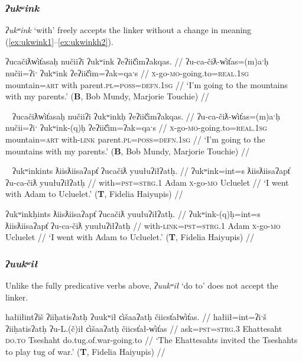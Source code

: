 \subsubsection{\textit{ʔukʷink}} \label{ch:link:ukwink} \textit{ʔukʷink} `with' freely accepts the linker without a change in meaning (\ref{ex:ukwink1}--\ref{ex:ukwinkh2}).

\ex \label{ex:ukwink1}
\begingl
\glpreamble ʔucačiƛw̓it̓asaḥ nučiiʔi ʔukʷink ʔeʔiič̓imʔakqas. //
\gla ʔu-ca-čiƛ-w̓it̓as=(m)aˑḥ nučii=ʔiˑ ʔukʷink ʔeʔiič̓im=ʔak=qaˑs //
\glb \textsc{x}-go-\textsc{mo}-going.to=\textsc{real.1sg} mountain=\textsc{art} with parent.\textsc{pl}=\textsc{poss}=\textsc{defn.1sg} //
\glft `I'm going to the mountains with my parents.' (\textbf{B}, Bob Mundy, Marjorie Touchie) //
\endgl
\xe

\ex~ \label{ex:ukwinkh1}
\begingl
\glpreamble ʔucačiƛw̓it̓asaḥ nučiiʔi ʔukʷinkḥ ʔeʔiič̓imʔakqas. //
\gla ʔu-ca-čiƛ-w̓it̓as=(m)aˑḥ nučii=ʔiˑ ʔukʷink-(q)ḥ ʔeʔiič̓im=ʔak=qaˑs //
\glb \textsc{x}-go-\textsc{mo}-going.to=\textsc{real.1sg} mountain=\textsc{art} with-\textsc{link} parent.\textsc{pl}=\textsc{poss}=\textsc{defn.1sg} //
\glft `I'm going to the mountains with my parents.' (\textbf{B}, Bob Mundy, Marjorie Touchie) //
\endgl
\xe

\ex~ \label{ex:ukwink2}
\begingl
\glpreamble ʔukʷinkints ƛiisƛiisaʔapt̓ ʔucačiƛ yuułuʔiłʔatḥ. //
\gla ʔukʷink=int=s ƛiisƛiisaʔapt̓ ʔu-ca-čiƛ yuułuʔiłʔatḥ //
\glb with=\textsc{pst}=\textsc{strg.1} Adam \textsc{x}-go-\textsc{mo} Ucluelet //
\glft `I went with Adam to Ucluelet.' (\textbf{T}, Fidelia Haiyupis) //
\endgl
\xe

\ex \label{ex:ukwinkh2}
\begingl
\glpreamble ʔukʷinkḥints ƛiisƛiisaʔapt̓ ʔucačiƛ yuułuʔiłʔatḥ. //
\gla ʔukʷink-(q)ḥ=int=s ƛiisƛiisaʔapt̓ ʔu-ca-čiƛ yuułuʔiłʔatḥ //
\glb with-\textsc{link}=\textsc{pst}=\textsc{strg.1} Adam \textsc{x}-go-\textsc{mo} Ucluelet //
\glft `I went with Adam to Ucluelet.' (\textbf{T}, Fidelia Haiyupis) //
\endgl
\xe

\subsubsection{\textit{ʔuukʷił}} \label{ch:link:uukwil} Unlike the fully predicative verbs above, \textit{ʔuukʷił} `do to' does not accept the linker.

\ex \label{ex:tugofwar1}
\begingl
\glpreamble hałiiłintʔiš ʔiiḥatisʔatḥ ʔuukʷił c̓išaaʔatḥ čiicst̓ałw̓it̓as. //
\gla hałiił=int=ʔiˑš ʔiiḥatisʔatḥ ʔu-L.(č)ił c̓išaaʔatḥ čiicst̓ał-w̓it̓as //
\glb ask=\textsc{pst}=\textsc{strg.3} Ehattesaht \textsc{do.to} Tseshaht do.tug.of.war-going.to //
\glft `The Ehattesahts invited the Tseshahts to play tug of war.' (\textbf{T}, Fidelia Haiyupis) //
\endgl
\xe

